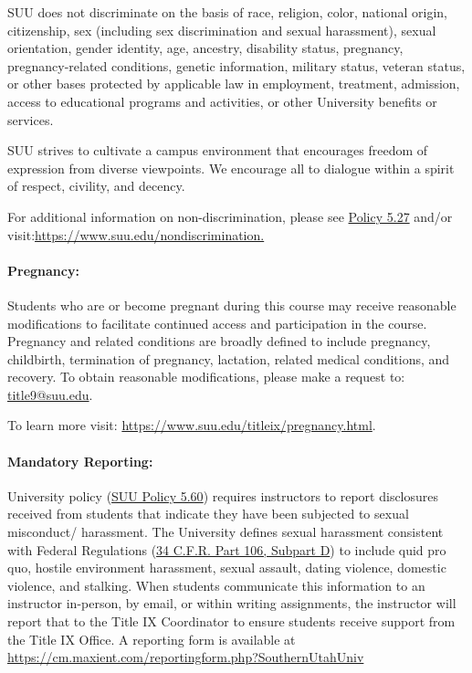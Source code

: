 \documentclass[12pt, letterpaper]{article}
\begin{document}
\noindent
SUU does not discriminate on the basis of race, religion, color, national origin, citizenship, sex (including sex discrimination and sexual harassment), sexual orientation, gender identity, age, ancestry, disability status, pregnancy, pregnancy-related conditions, genetic information, military status, veteran status, or other bases protected by applicable law in employment, treatment, admission, access to educational programs and activities, or other University benefits or services.

\noindent
SUU strives to cultivate a campus environment that encourages freedom of expression from diverse viewpoints. We encourage all to dialogue within a spirit of respect, civility, and decency. 

\noindent
For additional information on non-discrimination, please see \href{https://www.suu.edu/policies/05/27.html}{Policy 5.27} and/or visit:\newline \href{https://www.suu.edu/nondiscrimination.}{https://www.suu.edu/nondiscrimination.}

\paragraph{Pregnancy:}
Students who are or become pregnant during this course may receive reasonable modifications to facilitate continued access and participation in the course. Pregnancy and related conditions are broadly defined to include pregnancy, childbirth, termination of pregnancy, lactation, related medical conditions, and recovery. To obtain reasonable modifications, please make a request to: \href{title9@suu.edu}{title9@suu.edu}.

\noindent To learn more visit: \href{https://www.suu.edu/titleix/pregnancy.html}{https://www.suu.edu/titleix/pregnancy.html}.

\paragraph{Mandatory Reporting:}
University policy (\href{https://www.suu.edu/policies/05/60.html}{SUU Policy 5.60}) requires instructors to report disclosures received from students that indicate they have been subjected to sexual misconduct/ harassment. The University defines sexual harassment consistent with Federal Regulations (\href{https://www.ecfr.gov/current/title-34/subtitle-B/chapter-I/part-106/subpart-D}{34 C.F.R. Part 106, Subpart D}) to include quid pro quo, hostile environment harassment, sexual assault, dating violence, domestic violence, and stalking. When students communicate this information to an instructor in-person, by email, or within writing assignments, the instructor will report that to the Title IX Coordinator to ensure students receive support from the Title IX Office. A reporting form is available at \href{https://cm.maxient.com/reportingform.php?SouthernUtahUniv}{https://cm.maxient.com/reportingform.php?SouthernUtahUniv} 
\end{document}
